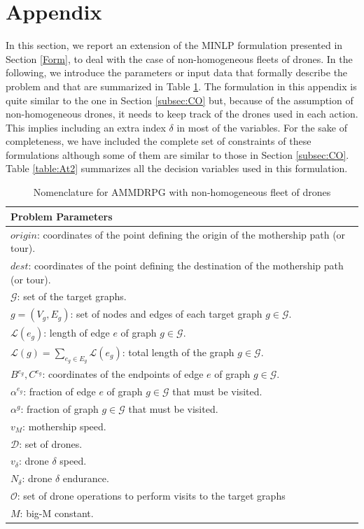 \documentclass[10pt,a4paper]{elsarticle}
\newcommand{\EN}[1]{{\color{black}#1}}
\begin{document}




\section{Appendix}\label{App}
\noindent
In this section, we report an extension of the MINLP formulation presented in Section \ref{Form}, \EN{to deal} with the case of non\EN{-}homogeneous fleets of drones.
\noindent
In the following, we introduce the parameters or input data that formally describe the problem and that are summarized in Table \ref{table:At1}.
\noindent
The formulation in this appendix is \EN{quite} similar to the one in Section \ref{subsec:CO} but, because of the assumption of non\EN{-}homogeneous drones, it needs to keep track of the drones used in each action. This implies \EN{including} an extra index $\delta$ in most of the variables. For the sake of completeness, we have included the complete set of constraints of \EN{these} formulations although some of them are similar to those in Section \ref{subsec:CO}. Table \ref{table:At2} summarizes all the decision variables used in this formulation.

\begin{table}[!h]
	\scriptsize
	\centering
	\begin{tabular}{ | l | }
		\hline
		\textbf{Problem Parameters}\\
		\hline
		$origin$: coordinates of the point defining the origin of the mothership path (or tour).\\
		$dest$: coordinates of the point defining the destination of the mothership path (or tour).\\
		$\mathcal{G}$: set of the target graphs.\\
		$g = (V_g, E_g)$: set of nodes and edges of each target graph $g \in \mathcal{G}$.\\
		$\mathcal{L}(e_g)$: length of edge $e$ of graph $g \in \mathcal{G}$.\\
		$\mathcal{L}(g)=\sum_{e_g\in E_g} \mathcal L(e_g)$: total length of the graph $g\in\mathcal G$.\\
		$B^{e_g}, C^{e_g}$: coordinates of the endpoints of edge $e$ of graph $g \in \mathcal{G}$.\\
		$\alpha^{e_g}$: fraction of edge $e$ of graph $g \in \mathcal{G}$ that must be visited.\\
		$\alpha^{g}$: fraction of graph $g \in \mathcal{G}$ that must be visited.\\
		$v_M$: mothership speed.\\
		$\mathcal D$: set of drones.\\
		$v_\delta$: drone $\delta$ speed.\\
		$N_\delta$: drone $\delta$ endurance. \\
		$\mathcal{O}$: set of drone operations to perform visits to the target graphs\\
		$M$: big-M constant.\\
		\hline
	\end{tabular}
	\caption{Nomenclature for AMMDRPG with non-homogeneous fleet of drones}
	\label{table:At1}
\end{table}
\end{document}
